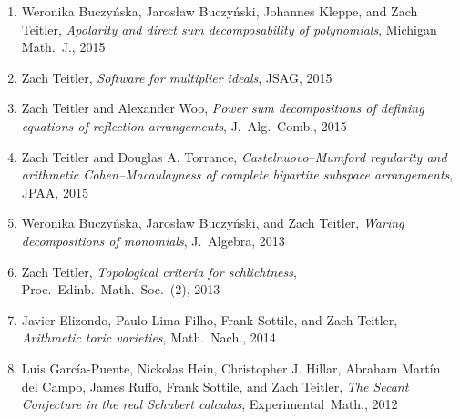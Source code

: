 \documentclass[12pt]{article}
\begin{document}
\begin{enumerate}[revarabic,labelwidth=*]
\item Weronika Buczy\'nska, Jaros{\l}aw Buczy\'nski, Johannes Kleppe, and Zach Teitler,
\emph{Apolarity and direct sum decomposability of polynomials},
Michigan Math.\ J.,
2015

\item Zach Teitler,
\emph{Software for multiplier ideals},
JSAG,
2015

\item Zach Teitler and Alexander Woo,
\emph{Power sum decompositions of defining equations of reflection arrangements},
J.~Alg.\ Comb.,
2015

\item Zach Teitler and Douglas A. Torrance,
\emph{Castelnuovo--Mumford regularity and arithmetic Cohen--Macaulayness of complete bipartite subspace arrangements},
JPAA,
2015

\item Weronika Buczy\'nska, Jaros{\l}aw Buczy\'nski, and Zach Teitler,
\emph{Waring decompositions of monomials},
J.\ Algebra,
2013

\item Zach Teitler,
\emph{Topological criteria for schlichtness},
Proc.\ Edinb.\ Math.\ Soc.\ (2),
2013

\item Javier Elizondo, Paulo Lima-Filho, Frank Sottile, and Zach Teitler,
\emph{Arithmetic toric varieties},
Math.\ Nach.,
2014

\item Luis Garc\'ia-Puente, Nickolas Hein, Christopher J. Hillar, Abraham Mart\'in del Campo, James Ruffo, Frank Sottile, and Zach Teitler,
\emph{The Secant Conjecture in the real Schubert calculus},
Experimental~Math.,
2012


\end{enumerate}
\end{document}
